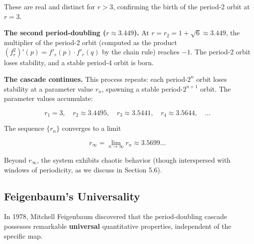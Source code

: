 These are real and distinct for $r > 3$, confirming the birth of the period-2 orbit at $r = 3$.

\textbf{The second period-doubling ($r \approx 3.449$).} At $r = r_2 = 1 + \sqrt{6} \approx 3.449$, the multiplier of the period-2 orbit (computed as the product $(f_r^2)'(p) = f'_r(p) \cdot f'_r(q)$ by the chain rule) reaches $-1$. The period-2 orbit loses stability, and a stable period-4 orbit is born.

\textbf{The cascade continues.} This process repeats: each period-$2^n$ orbit loses stability at a parameter value $r_n$, spawning a stable period-$2^{n+1}$ orbit. The parameter values accumulate:

\[
r_1 = 3, \quad r_2 \approx 3.4495, \quad r_3 \approx 3.5441, \quad r_4 \approx 3.5644, \quad \ldots
\]

The sequence $\{r_n\}$ converges to a limit

\[
r_\infty = \lim_{n \to \infty} r_n \approx 3.5699\ldots
\]

Beyond $r_\infty$, the system exhibits chaotic behavior (though interspersed with windows of periodicity, as we discuss in Section 5.6).

\subsection{Feigenbaum's Universality}\label{sec:5.5.3}

In 1978, Mitchell Feigenbaum discovered that the period-doubling cascade possesses remarkable \textbf{universal} quantitative properties, independent of the specific map.


